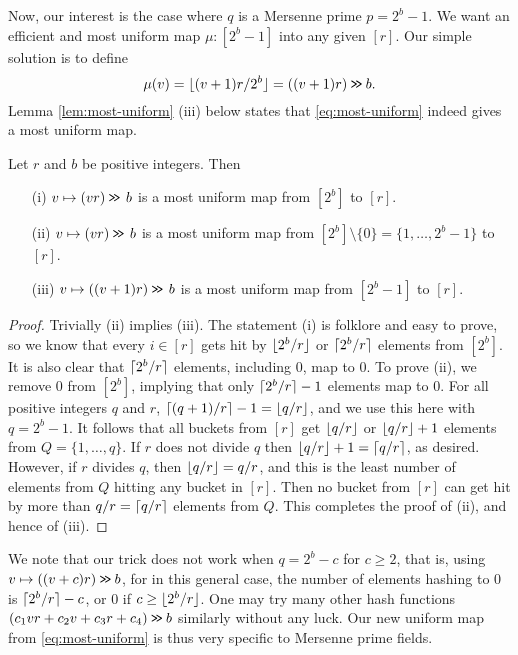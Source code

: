 Now, our interest is the case where $q$ is a Mersenne prime $p=2^b-1$. We want
an efficient and most uniform map $\mu:[2^b-1]$ into any given $[r]$.
Our simple solution is to define
\begin{equation}\label{eq:most-uniform}
	\mu(v)=\lfloor {(v+1)r/2^b} \rfloor=((v+1)r)\mathbin{\texttt{>\!>}} b.
\end{equation}
Lemma \ref{lem:most-uniform} (iii) below
states that \eqref{eq:most-uniform} indeed
gives a most uniform map.
\begin{lemma}\label{lem:most-uniform} Let $r$ and $b$ be positive integers.
	Then
	\begin{itemize}
		\item[(i)] $v\mapsto (vr)\mathbin{\texttt{>\!>}}\,b$ is a most
		      uniform map from $[2^b]$ to $[r]$.
		\item[(ii)] $v\mapsto (vr)\mathbin{\texttt{>\!>}}\,b$ is a most
		      uniform map from $[2^b]\setminus\{0\}=\{1,\ldots,2^b-1\}$ to $[r]$.
		\item[(iii)] $v\mapsto ((v+1)r)\mathbin{\texttt{>\!>}} \, b$ is a most
		      uniform map from $[2^b-1]$ to $[r]$.
	\end{itemize}
\end{lemma}
\begin{proof}
	Trivially (ii) implies (iii).
	The statement (i) is folklore and easy to prove, so we know that every
	$i\in[r]$ gets hit by $\lfloor {2^b/r} \rfloor$ or $\lceil {2^b/r}\rceil$ elements from
	$[2^b]$. It is also clear that $\lceil {2^b/r}\rceil$ elements, including $0$,
	map to $0$. To prove (ii), we remove $0$ from $[2^b]$,
	implying that only
	$\lceil {2^b/r}\rceil-1$ elements map to $0$. For all positive integers $q$
	and $r$, $\lceil {(q+1)/r}\rceil-1=\lfloor {q/r} \rfloor$, and we use this here with
	$q=2^b-1$. It follows that all buckets from $[r]$ get $\lfloor {q/r} \rfloor$
	or $\lfloor {q/r} \rfloor+1$ elements from $Q=\{1,\ldots,q\}$. If $r$ does
	not divide $q$ then $\lfloor {q/r} \rfloor+1=\lceil {q/r}\rceil$, as desired. However,
	if $r$ divides $q$, then $\lfloor {q/r} \rfloor=q/r$, and this
	is the least number of elements from $Q$ hitting any bucket in $[r]$. Then
	no bucket from $[r]$ can get hit by more than $q/r=\lceil {q/r}\rceil$
	elements from $Q$. This completes the proof of (ii), and hence of (iii).
\end{proof}
We note that our trick does not work when $q=2^b-c$ for $c\geq 2$, that is,
using $v\mapsto ((v+c)r)\mathbin{\texttt{>\!>}}  b$, for in this general case,
the number of elements hashing to $0$ is $\lceil {2^b/r}\rceil-c$, or $0$ if
$c\geq \lfloor {2^b/r} \rfloor$.
One may try many other hash functions $(c_1 v r+ c_2 v+ c_3 r + c_4) \mathbin{\texttt{>\!>}} b$ similarly without any luck.
Our new uniform map from \eqref{eq:most-uniform} is thus very specific to Mersenne prime fields.

